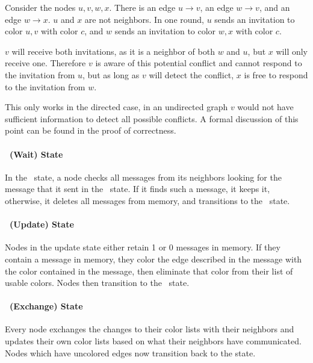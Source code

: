 Consider the nodes $u,v,w,x$. There is an edge $u \to v$, an edge $w \to v$, and an edge $w \to x$. $u$ and $x$ are not neighbors. In one round, $u$ sends an invitation to color $u, v$ with color $c$, and $w$ sends an invitation to color $w,x$ with color $c$. 

$v$ will receive both invitations, as it is a neighbor of both $w$ and $u$, but $x$ will only receive one. Therefore $v$ is aware of this potential conflict and cannot respond to the invitation from $u$, but as long as $v$ will detect the conflict, $x$ is free to respond to the invitation from $w$. 

This only works in the directed case, in an undirected graph $v$ would not have sufficient information to detect all possible conflicts. A formal discussion of this point can be found in the proof of correctness.

\paragraph{\cWd\ (Wait) State}
In the \cWd\ state, a node checks all messages from its neighbors looking for the message that it sent in the \cId\ state. If it finds such a message, it keeps it, otherwise, it deletes all messages from memory, and transitions to the \cUd\ state.

\paragraph{\cUd\ (Update) State}
Nodes in the update state either retain 1 or 0 messages in memory. If they contain a message in memory, they color the edge described in the message with the color contained in the message, then eliminate that color from their list of usable colors. Nodes then transition to the \cEd\ state.

\paragraph{\cEd\ (Exchange) State}
Every node exchanges the changes to their color lists with their neighbors and updates their own color lists based on what their neighbors have communicated. Nodes which have uncolored edges now transition back to the \cCd state.
